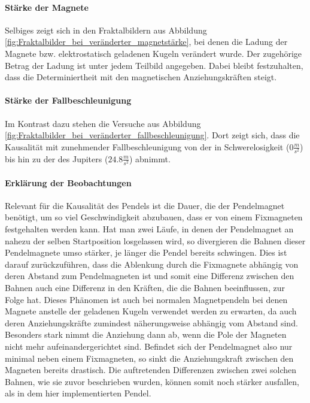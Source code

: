 \paragraph{Stärke der Magnete} Selbiges zeigt sich in den Fraktalbildern aus Abbildung \ref{fig:Fraktalbilder_bei_veränderter_magnetstärke}, bei denen die Ladung der Magnete bzw. elektrostatisch geladenen Kugeln verändert wurde. Der zugehörige Betrag der Ladung ist unter jedem Teilbild angegeben. Dabei bleibt festzuhalten, dass die Determiniertheit mit den magnetischen Anziehungskräften steigt.

\paragraph{Stärke der Fallbeschleunigung} Im Kontrast dazu stehen die Versuche aus Abbildung \ref{fig:Fraktalbilder_bei_veränderter_fallbeschleunigung}. Dort zeigt sich, dass die Kausalität mit zunehmender Fallbeschleunigung von der in Schwerelosigkeit ($0 \frac{m}{s^2}$) bis hin zu der des Jupiters ($24.8 \frac{m}{s^2}$) abnimmt.

\paragraph{Erklärung der Beobachtungen} Relevant für die Kausalität des Pendels ist die Dauer, die der Pendelmagnet benötigt, um so viel Geschwindigkeit abzubauen, dass er von einem Fixmagneten festgehalten werden kann. Hat man zwei Läufe, in denen der Pendelmagnet an nahezu der selben Startposition losgelassen wird, so divergieren die Bahnen dieser Pendelmagnete umso stärker, je länger die Pendel bereits schwingen. Dies ist darauf zurückzuführen, dass die Ablenkung durch die Fixmagnete abhängig von deren Abstand zum Pendelmagneten ist und somit eine Differenz zwischen den Bahnen auch eine Differenz in den Kräften, die die Bahnen beeinflussen, zur Folge hat. Dieses Phänomen ist auch bei normalen Magnetpendeln bei denen Magnete anstelle der geladenen Kugeln verwendet werden zu erwarten, da auch deren Anziehungskräfte zumindest näherungsweise abhängig vom Abstand sind. Besonders stark nimmt die Anziehung dann ab, wenn die Pole der Magneten nicht mehr aufeinandergerichtet sind. Befindet sich der Pendelmagnet also nur minimal neben einem Fixmagneten, so sinkt die Anziehungskraft zwischen den Magneten bereits drastisch. Die auftretenden Differenzen zwischen zwei solchen Bahnen, wie sie zuvor beschrieben wurden, können somit noch stärker ausfallen, als in dem hier implementierten Pendel.

